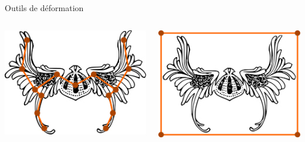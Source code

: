 \documentclass[xcolor=x11names,compress]{beamer}
\renewcommand{\(}{\begin{columns}} \renewcommand{\)}{\end{columns}}
\newcommand{\<}[1]{\begin{column}{#1}} \renewcommand{\>}{\end{column}}
\begin{document}
\begin{frame}{Outils de déformation}
\begin{columns}[t]
\begin{column}{0.5\textwidth}
    \end{column}
    \pause
  \end{columns} 
  \begin{columns}[t]
    \begin{column}{0.5\textwidth}
      \centering
      \includegraphics[scale=0.1]{Outil-Mono-Courbes}
    \end{column}
    \pause
    \begin{column}{0.5\textwidth}
      \centering
      \includegraphics[scale=0.1]{Outil-Mono-Surfaces}
    \end{column}
  \end{columns} 
\end{frame}
\end{document}
